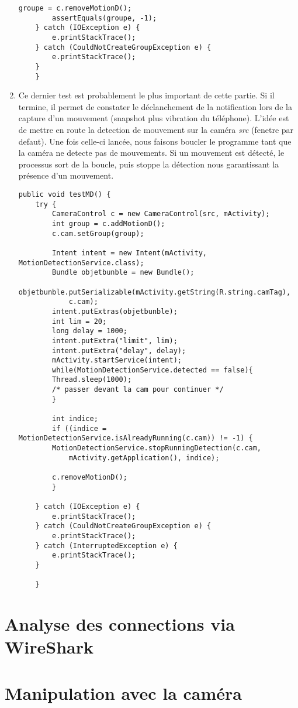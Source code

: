 \begin{enumerate}
\begin{lstlisting}[format=JAVA,caption={Test 6 : Ajout et suppression d'une fenetre}]
	    groupe = c.removeMotionD();
	    assertEquals(groupe, -1);
	} catch (IOException e) {
	    e.printStackTrace();
	} catch (CouldNotCreateGroupException e) {
	    e.printStackTrace();
	}
    }
\end{lstlisting}
\item Ce dernier test est probablement le plus important de cette partie. Si il termine, il permet de constater le déclanchement de la notification lors de la capture d'un mouvement (snapshot plus vibration du téléphone). L'idée est de mettre en route la detection de mouvement sur la caméra \textit{src} (fenetre par defaut). Une fois celle-ci lancée, nous faisons boucler le programme tant que la caméra ne detecte pas de mouvements. Si un mouvement est détecté, le processus sort de la boucle, puis stoppe la détection nous garantissant la présence d'un mouvement.

\begin{lstlisting}[format=JAVA,caption={Test 7 :Détection des mouvements}]
    public void testMD() {
	try {
	    CameraControl c = new CameraControl(src, mActivity);
	    int group = c.addMotionD();
	    c.cam.setGroup(group);
	    
	    Intent intent = new Intent(mActivity, MotionDetectionService.class);
	    Bundle objetbunble = new Bundle();
	    objetbunble.putSerializable(mActivity.getString(R.string.camTag),
		    c.cam);
	    intent.putExtras(objetbunble);
	    int lim = 20;
	    long delay = 1000;
	    intent.putExtra("limit", lim);
	    intent.putExtra("delay", delay);
	    mActivity.startService(intent);
	    while(MotionDetectionService.detected == false){
		Thread.sleep(1000);
		/* passer devant la cam pour continuer */
	    }
	    
	    int indice;
	    if ((indice = MotionDetectionService.isAlreadyRunning(c.cam)) != -1) {
		MotionDetectionService.stopRunningDetection(c.cam,
			mActivity.getApplication(), indice);

		c.removeMotionD();
	    }

	} catch (IOException e) {
	    e.printStackTrace();
	} catch (CouldNotCreateGroupException e) {
	    e.printStackTrace();
	} catch (InterruptedException e) {
	    e.printStackTrace();
	}

    }

\end{lstlisting}
\end{enumerate}


\section{Analyse des connections via WireShark}

\section{Manipulation avec la caméra}

